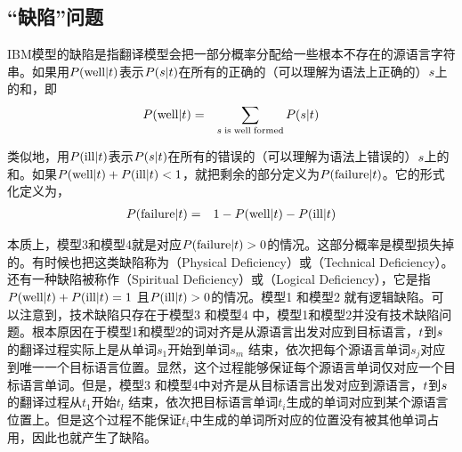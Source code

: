 
\subsection{“缺陷”问题}

\parinterval IBM模型的缺陷是指翻译模型会把一部分概率分配给一些根本不存在的源语言字符串。如果用${P}(\textrm{well}|{t})$表示${P}({s}| {t})$在所有的正确的（可以理解为语法上正确的）${s}$上的和，即
\begin{eqnarray}
{P}(\textrm{well}|{t}) & = & \sum_{{s}\textrm{\;is\;well\;formed}}{{P}({s}| {t})}
\label{eq:6-26}
\end{eqnarray}

\parinterval 类似地，用${P}(\textrm{ill}|{t})$表示${P}({s}| {t})$在所有的错误的（可以理解为语法上错误的）${s}$上的和。如果${P}(\textrm{well}|{t})+ {P}(\textrm{ill}|{t})<1$，就把剩余的部分定义为${P}(\textrm{failure}|{t})$。它的形式化定义为，
\begin{eqnarray}
{P}({\textrm{failure}|{t}}) & = & 1 - {P}({\textrm{well}|{t}}) - {P}({\textrm{ill}|{t}})
\label{eq:6-27}
\end{eqnarray}

\parinterval 本质上，模型3和模型4就是对应${P}({\textrm{failure}|{t}})>0$的情况。这部分概率是模型损失掉的。有时候也把这类缺陷称为{\small{}}（Physical Deficiency）或{\small{}}（Technical Deficiency）。还有一种缺陷被称作{\small{}}（Spiritual Deficiency）或{\small{}}（Logical Deficiency），它是指${P}({\textrm{well}|{t}}) + {P}({\textrm{ill}|{t}}) = 1$ 且${P}({\textrm{ill}|{t}}) > 0$的情况。模型1 和模型2 就有逻辑缺陷。可以注意到，技术缺陷只存在于模型3 和模型4 中，模型1和模型2并没有技术缺陷问题。根本原因在于模型1和模型2的词对齐是从源语言出发对应到目标语言，${t}$到${s}$ 的翻译过程实际上是从单词$s_1$开始到单词$s_m$ 结束，依次把每个源语言单词$s_j$对应到唯一一个目标语言位置。显然，这个过程能够保证每个源语言单词仅对应一个目标语言单词。但是，模型3 和模型4中对齐是从目标语言出发对应到源语言，${t}$到${s}$的翻译过程从$t_1$开始$t_l$ 结束，依次把目标语言单词$t_i$生成的单词对应到某个源语言位置上。但是这个过程不能保证$t_i$中生成的单词所对应的位置没有被其他单词占用，因此也就产生了缺陷。

